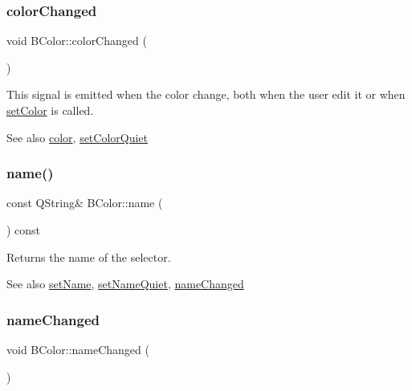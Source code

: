 \subsubsection{\texorpdfstring{color\+Changed}{colorChanged}}
{\footnotesize\ttfamily void B\+Color\+::color\+Changed (\begin{DoxyParamCaption}\item[{const Q\+Color \&}]{ }\end{DoxyParamCaption})\hspace{0.3cm}{\ttfamily [signal]}}

This signal is emitted when the color change, both when the user edit it or when \hyperlink{class_b_color_a901e6704aef22f6db97d3578e14777c6}{set\+Color} is called.

\begin{DoxySeeAlso}{See also}
\hyperlink{class_b_color_af5d46ba62e3868ab618269dff46d5718}{color}, \hyperlink{class_b_color_a3781c2b986f19ceaac7c994767015b56}{set\+Color\+Quiet} 
\end{DoxySeeAlso}
\hypertarget{class_b_color_a130caf6bc837b4f53544bd5f11b34cd3}{}\label{class_b_color_a130caf6bc837b4f53544bd5f11b34cd3} 
\subsubsection{\texorpdfstring{name()}{name()}}
{\footnotesize\ttfamily const Q\+String\& B\+Color\+::name (\begin{DoxyParamCaption}{ }\end{DoxyParamCaption}) const}

Returns the name of the selector.

\begin{DoxySeeAlso}{See also}
\hyperlink{class_b_color_abcf2d57696ada6466424663f15624cad}{set\+Name}, \hyperlink{class_b_color_ac159569b670ed175be068204a28a7be9}{set\+Name\+Quiet}, \hyperlink{class_b_color_a5895b999f69044b919e6d5526577ad87}{name\+Changed} 
\end{DoxySeeAlso}
\hypertarget{class_b_color_a5895b999f69044b919e6d5526577ad87}{}\label{class_b_color_a5895b999f69044b919e6d5526577ad87} 
\subsubsection{\texorpdfstring{name\+Changed}{nameChanged}}
{\footnotesize\ttfamily void B\+Color\+::name\+Changed (\begin{DoxyParamCaption}\item[{const Q\+String \&}]{ }\end{DoxyParamCaption})\hspace{0.3cm}{\ttfamily [signal]}}

